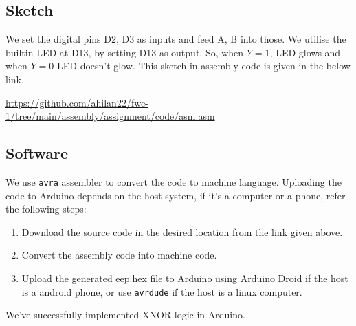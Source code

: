 \documentclass[journal,12pt,twocolumn]{IEEEtran}
\begin{document}
\subsection{Sketch}
We set the digital pins D2, D3 as inputs and feed A, B into those. We utilise the builtin LED at D13, by setting D13 as output. So, when $Y=1$, LED glows and when $Y=0$ LED doesn't glow. This sketch in assembly code is given in the below link.

\bigskip

\url{https://github.com/ahilan22/fwc-1/tree/main/assembly/assignment/code/asm.asm}

\subsection{Software}
We use \texttt{avra} assembler to convert the code to machine language. Uploading the code to Arduino depends on the host system, if it's a computer or a phone, refer the following steps:
\bigskip

\begin{enumerate}
	\item Download the source code in the desired location from the link given above.
	\item Convert the assembly code into machine code. 
	\item Upload the generated eep.hex file to Arduino using Arduino Droid if the host is a android phone, or use \texttt{avrdude} if the host is a linux computer.
\end{enumerate}
\bigskip
We've successfully implemented XNOR logic in Arduino.
\end{document}
